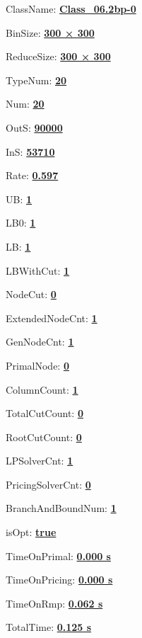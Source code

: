 \documentclass[11pt]{article}
\begin{document}
\pagestyle{empty}


ClassName: \underline{\textbf{Class_06.2bp-0}}
\par
BinSize: \underline{\textbf{300 × 300}}
\par
ReduceSize: \underline{\textbf{300 × 300}}
\par
TypeNum: \underline{\textbf{20}}
\par
Num: \underline{\textbf{20}}
\par
OutS: \underline{\textbf{90000}}
\par
InS: \underline{\textbf{53710}}
\par
Rate: \underline{\textbf{0.597}}
\par
UB: \underline{\textbf{1}}
\par
LB0: \underline{\textbf{1}}
\par
LB: \underline{\textbf{1}}
\par
LBWithCut: \underline{\textbf{1}}
\par
NodeCut: \underline{\textbf{0}}
\par
ExtendedNodeCnt: \underline{\textbf{1}}
\par
GenNodeCnt: \underline{\textbf{1}}
\par
PrimalNode: \underline{\textbf{0}}
\par
ColumnCount: \underline{\textbf{1}}
\par
TotalCutCount: \underline{\textbf{0}}
\par
RootCutCount: \underline{\textbf{0}}
\par
LPSolverCnt: \underline{\textbf{1}}
\par
PricingSolverCnt: \underline{\textbf{0}}
\par
BranchAndBoundNum: \underline{\textbf{1}}
\par
isOpt: \underline{\textbf{true}}
\par
TimeOnPrimal: \underline{\textbf{0.000 s}}
\par
TimeOnPricing: \underline{\textbf{0.000 s}}
\par
TimeOnRmp: \underline{\textbf{0.062 s}}
\par
TotalTime: \underline{\textbf{0.125 s}}
\par
\newpage
\end{document}
